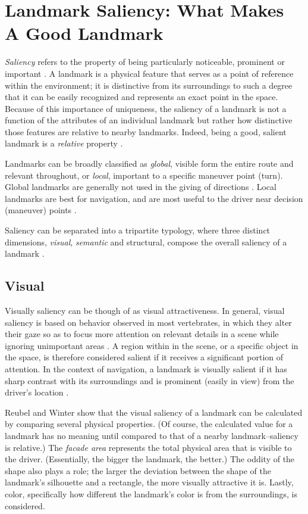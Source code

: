 \section{Landmark Saliency: What Makes A Good Landmark}\label{Sect:eqns}
\textit{Saliency} refers to the property of being particularly noticeable, prominent or important \cite{saliency_dict}. A landmark is a physical feature that serves as a point of reference within the environment; it is distinctive from its surroundings to such a degree that it can be easily recognized and represents an exact point in the space. Because of this importance of uniqueness, the saliency of a landmark is not a function of the attributes of an individual landmark but rather how distinctive those features are relative to nearby landmarks. Indeed, being a good, salient landmark is a \textit{relative} property \cite{raubal2002enriching}. 

Landmarks can be broadly classified as \textit{global}, visible form the entire route and relevant throughout, or \textit{local}, important to a specific maneuver point (turn). Global landmarks are generally not used in the giving of directions \cite{sorrows1999nature}. Local landmarks are best for navigation, and are most useful to the driver near decision (maneuver) points \cite{lee2003effect}.

Saliency can be separated into a tripartite typology, where three distinct dimensions, \textit{visual}, \textit{semantic} and \textit{}{structural}, compose the overall saliency of a landmark \cite{sorrows1999nature}. 

\subsection{Visual}
 Visually saliency can be though of as visual attractiveness. In general, visual saliency is based on behavior observed in most vertebrates, in which they alter their gaze so as to focus more attention on relevant details in a scene while ignoring unimportant areas \cite{harel2007graph}. A region within in the scene, or a specific object in the space, is therefore considered salient if it receives a significant portion of attention. In the context of navigation, a landmark is visually salient if it has sharp contrast with its surroundings and is prominent (easily in view) from the driver's location \cite{sorrows1999nature}. 

Reubel and Winter \cite{raubal2002enriching} show that the visual saliency of a landmark can be calculated by comparing several physical properties. (Of course, the calculated value for a landmark has no meaning until compared to that of a nearby landmark--saliency is relative.) The \textit{facade area} represents the total physical area that is visible to the driver. (Essentially, the bigger the landmark, the better.) The oddity of the shape also plays a role; the larger the deviation between the shape of the landmark's silhouette and a rectangle, the more visually attractive it is. Lastly, color, specifically how different the landmark's color is from the surroundings, is considered.

